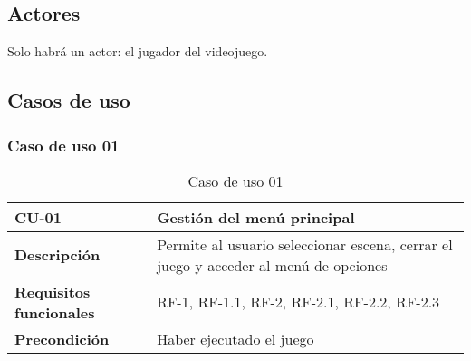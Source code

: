 \subsection{Actores}
Solo habrá un actor: el jugador del videojuego.
\subsection{Casos de uso}

\subsubsection{Caso de uso 01}

\begin{longtable}{l|l}
\caption{Caso de uso 01}\\
\begin{minipage}{0.25\columnwidth}
\textbf{CU-01} 
\end{minipage}
&
\begin{minipage}{0.65\columnwidth}
Gestión del menú principal
\end{minipage}
\\ \hline

\begin{minipage}{0.25\columnwidth}
\textbf{Descripción} 
\end{minipage}
&
\begin{minipage}{0.65\columnwidth}
Permite al usuario seleccionar escena, cerrar el juego y acceder al menú de opciones
\end{minipage}
\\ \hline

\begin{minipage}{0.25\columnwidth}
\textbf{Requisitos funcionales} 
\end{minipage}
&
\begin{minipage}{0.65\columnwidth}
RF-1, RF-1.1, RF-2, RF-2.1, RF-2.2, RF-2.3                                                                                                                    
\end{minipage}
\\ \hline

\begin{minipage}{0.25\columnwidth}
\textbf{Precondición} 
\end{minipage}
&
\begin{minipage}{0.65\columnwidth}
Haber ejecutado el juego
\end{minipage}
\\ \hline


\end{longtable}
